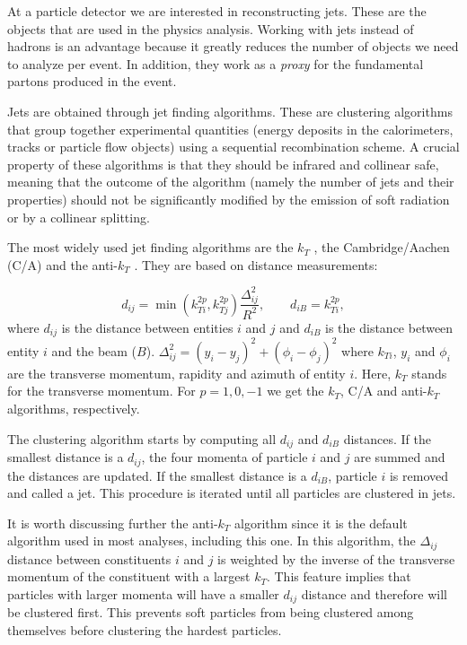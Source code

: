 At a particle detector we are interested in reconstructing jets. These are the objects that are used in the physics analysis. Working with jets instead of hadrons is an advantage because it greatly reduces the number of objects we need to analyze per event. In addition, they work as a \textit{proxy} for the fundamental partons produced in the event.

Jets are obtained through jet finding algorithms. These are clustering algorithms that group together experimental quantities (energy deposits in the calorimeters, tracks or particle flow objects) using a sequential recombination scheme. A crucial property of these algorithms is that they should be infrared and collinear safe, meaning that the outcome of the algorithm (namely the number of jets and their properties) should not be significantly
modified by the emission of soft radiation or by a collinear splitting.

The most widely used jet finding algorithms are the $k_T$ \cite{kt}, the Cambridge/Aachen (C/A) \cite{CA} and the anti-$k_T$ \cite{anti-kt}. They are based on distance measurements:

\begin{equation}
d_{ij}=\min(k_{Ti}^{2p},k_{Tj}^{2p})\frac{\Delta_{ij}^2}{R^2}, \qquad
d_{iB}=k_{Ti}^{2p},
\end{equation}
where $d_{ij}$ is the distance between entities $i$ and $j$ and $d_{iB}$ is the distance between entity $i$ and the beam ($B$). $\Delta_{ij}^2=(y_i-y_j)^2+(\phi_i-\phi_j)^2$ where $k_{Ti}$, $y_i$ and $\phi_i$ are the transverse momentum, rapidity and azimuth of entity $i$. Here, $k_{T}$ stands for the transverse momentum. For $p=1,0,-1$ we get the $k_T$, C/A and anti-$k_T$ algorithms, respectively.

The clustering algorithm starts by computing all $d_{ij}$ and $d_{iB}$ distances. If the smallest distance is a $d_{ij}$, the four momenta of particle $i$ and $j$ are summed and the distances are updated. If the smallest distance is a $d_{iB}$, particle $i$ is removed and called a jet. This procedure is iterated until all particles are clustered in jets.

It is worth discussing further the anti-$k_T$ algorithm since it is the default algorithm used in most analyses, including this one. In this algorithm, the $\Delta_{ij}$ distance between constituents $i$ and $j$ is weighted by the inverse of the transverse momentum of the constituent with a largest $k_T$. This feature implies that particles with larger momenta will have a smaller $d_{ij}$ distance and therefore will be clustered first. This prevents soft particles from being clustered among themselves before clustering the hardest particles.

